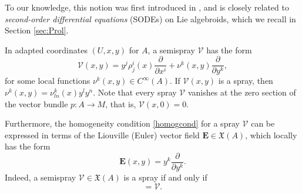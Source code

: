 \documentclass[12pt,letterpaper]{article}
\newtheorem{definition}[theorem]{Definition}
\newtheorem{remark}[theorem]{Remark}
\numberwithin{equation}{section}
\begin{document}




To our knowledge, this notion was first introduced in \cite[Definition 2.2]{Weinstein1996}, and is closely related to
\emph{second-order differential equations} (SODEs) on Lie algebroids, which we recall in Section \ref{sec:Prol}.

In adapted coordinates  $(U, x, y)$ for $A$, a semispray $\mathcal{V}$  has the form
\begin{equation*}
\mathcal{V}(x,y)=y^j\rho^i_j(x)\frac{\partial}{\partial x^i}+\nu^k(x,y)\frac{\partial}{\partial y^k},
\end{equation*}
for some local functions $\nu^k(x,y)\in C^\infty (A)$. If  $ \mathcal{V}(x,y)$ is a spray, then $\nu^k(x,y)=\nu^k_{ln}(x)y^ly^n $. Note that every spray  $ \mathcal{V}$ vanishes at the zero section of the vector bundle $p: A \rightarrow M$, that is, $ \mathcal{V}(x,0)=0$.

Furthermore, the homogeneity condition \eqref{homogcond} for a spray $\mathcal{V}$ can be expressed in terms of the  Liouville (Euler) vector field $\mathbf{E}\in \mathfrak{X}(A)$, which locally has the form
\begin{equation*}
\mathbf{E}(x,y)=y^k\frac{\partial}{\partial y^k}.
\end{equation*}
Indeed, a semispray $\mathcal{V}\in \mathfrak{X}(A)$ is a spray if and only if 
\begin{equation*}
[ \mathbf{E},\mathcal{V} ]= \mathcal{V}.
\end{equation*}
\end{document}
